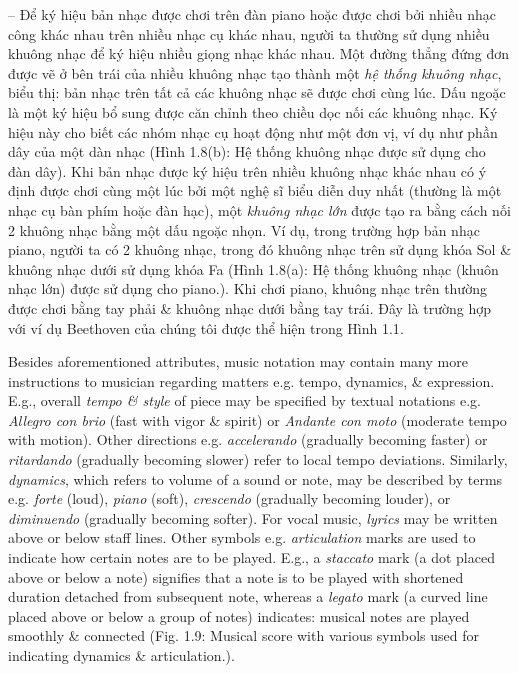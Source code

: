 \documentclass{article}
\begin{document}
\begin{itemize}
\begin{itemize}
\begin{itemize}
			-- Để ký hiệu bản nhạc được chơi trên đàn piano hoặc được chơi bởi nhiều nhạc công khác nhau trên nhiều nhạc cụ khác nhau, người ta thường sử dụng nhiều khuông nhạc để ký hiệu nhiều giọng nhạc khác nhau. Một đường thẳng đứng đơn được vẽ ở bên trái của nhiều khuông nhạc tạo thành một {\it hệ thống khuông nhạc}, biểu thị: bản nhạc trên tất cả các khuông nhạc sẽ được chơi cùng lúc. Dấu ngoặc là một ký hiệu bổ sung được căn chỉnh theo chiều dọc nối các khuông nhạc. Ký hiệu này cho biết các nhóm nhạc cụ hoạt động như một đơn vị, ví dụ như phần dây của một dàn nhạc ({\sf Hình 1.8(b): Hệ thống khuông nhạc được sử dụng cho đàn dây}). Khi bản nhạc được ký hiệu trên nhiều khuông nhạc khác nhau có ý định được chơi cùng một lúc bởi một nghệ sĩ biểu diễn duy nhất (thường là một nhạc cụ bàn phím hoặc đàn hạc), một {\it khuông nhạc lớn} được tạo ra bằng cách nối 2 khuông nhạc bằng một dấu ngoặc nhọn. Ví dụ, trong trường hợp bản nhạc piano, người ta có 2 khuông nhạc, trong đó khuông nhạc trên sử dụng khóa Sol \& khuông nhạc dưới sử dụng khóa Fa ({\sf Hình 1.8(a): Hệ thống khuông nhạc (khuôn nhạc lớn) được sử dụng cho piano.}). Khi chơi piano, khuông nhạc trên thường được chơi bằng tay phải \& khuông nhạc dưới bằng tay trái. Đây là trường hợp với ví dụ Beethoven của chúng tôi được thể hiện trong {\sf Hình 1.1}.
			
			Besides aforementioned attributes, music notation may contain many more instructions to musician regarding matters e.g. tempo, dynamics, \& expression. E.g., overall {\it tempo \& style} of piece may be specified by textual notations e.g. {\it Allegro con brio} (fast with vigor \& spirit) or {\it Andante con moto} (moderate tempo with motion). Other directions e.g. {\it accelerando} (gradually becoming faster) or {\it ritardando} (gradually becoming slower) refer to local tempo deviations. Similarly, {\it dynamics}, which refers to volume of a sound or note, may be described by terms e.g. {\it forte} (loud), {\it piano} (soft), {\it crescendo} (gradually becoming louder), or {\it diminuendo} (gradually becoming softer). For vocal music, {\it lyrics} may be written above or below staff lines. Other symbols e.g. {\it articulation} marks are used to indicate how certain notes are to be played. E.g., a {\it staccato} mark (a dot placed above or below a note) signifies that a note is to be played with shortened duration detached from subsequent note, whereas a {\it legato} mark (a curved line placed above or below a group of notes) indicates: musical notes are played smoothly \& connected ({\sf Fig. 1.9: Musical score with various symbols used for indicating dynamics \& articulation.}).
			

\end{itemize}
\end{itemize}
\end{itemize}
\end{document}
